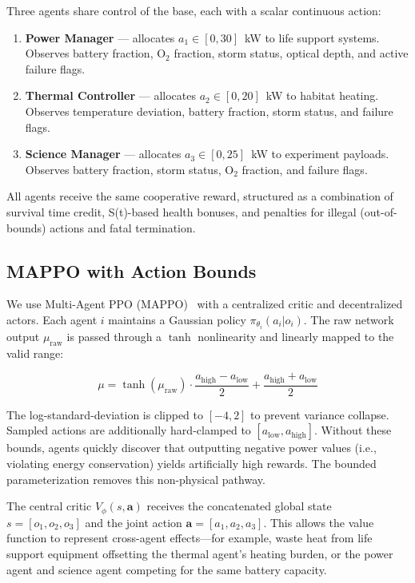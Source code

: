 \documentclass[11pt,a4paper]{article}
\begin{document}
Three agents share control of the base, each with a scalar continuous action:

\begin{enumerate}[label=\textbf{Agent \arabic*:}]
  \item \textbf{Power Manager} --- allocates $a_1 \in [0, 30]$~kW to life support systems. Observes battery fraction, O$_2$ fraction, storm status, optical depth, and active failure flags.
  \item \textbf{Thermal Controller} --- allocates $a_2 \in [0, 20]$~kW to habitat heating. Observes temperature deviation, battery fraction, storm status, and failure flags.
  \item \textbf{Science Manager} --- allocates $a_3 \in [0, 25]$~kW to experiment payloads. Observes battery fraction, storm status, O$_2$ fraction, and failure flags.
\end{enumerate}

All agents receive the same cooperative reward, structured as a combination of survival time credit, S(t)-based health bonuses, and penalties for illegal (out-of-bounds) actions and fatal termination.

\subsection{MAPPO with Action Bounds}

We use Multi-Agent PPO (MAPPO)~\cite{mappo} with a centralized critic and decentralized actors. Each agent $i$ maintains a Gaussian policy $\pi_{\theta_i}(a_i | o_i)$. The raw network output $\mu_{\text{raw}}$ is passed through a $\tanh$ nonlinearity and linearly mapped to the valid range:

\begin{equation}\label{eq:tanh}
  \mu = \tanh(\mu_{\text{raw}}) \cdot \frac{a_{\text{high}} - a_{\text{low}}}{2} + \frac{a_{\text{high}} + a_{\text{low}}}{2}
\end{equation}

The log-standard-deviation is clipped to $[-4, 2]$ to prevent variance collapse. Sampled actions are additionally hard-clamped to $[a_{\text{low}}, a_{\text{high}}]$. Without these bounds, agents quickly discover that outputting negative power values (i.e., violating energy conservation) yields artificially high rewards. The bounded parameterization removes this non-physical pathway.

The central critic $V_\phi(s, \mathbf{a})$ receives the concatenated global state $s = [o_1, o_2, o_3]$ and the joint action $\mathbf{a} = [a_1, a_2, a_3]$. This allows the value function to represent cross-agent effects---for example, waste heat from life support equipment offsetting the thermal agent's heating burden, or the power agent and science agent competing for the same battery capacity.
\end{document}
